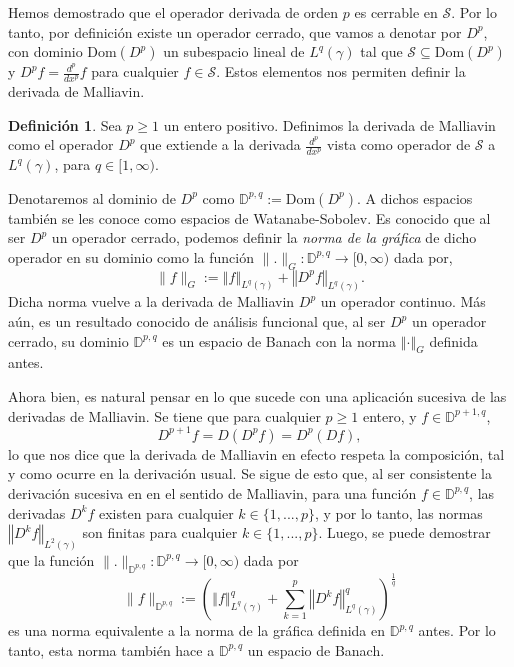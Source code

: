 \documentclass[letterpaper,twoside,12pt]{book}
\newcommand{\D}{\mathbb{D}}
\renewcommand{\S}{\mathcal{S}}
\newcommand{\1}{\mathds{1}}
\newcommand{\norm}[1]{\left\Vert #1 \right\Vert}
\theoremstyle{definition}
\newtheorem{dfn}{Definición}
\theoremstyle{definition}
\theoremstyle{remark}
\theoremstyle{definition}
\theoremstyle{definition}
\theoremstyle{definition}
\theoremstyle{definition}
\theoremstyle{definition}
\begin{document}
Hemos demostrado que el operador derivada de orden $p$ es cerrable en $\S$. Por lo tanto, por definición existe un operador cerrado, que vamos a denotar por $D^{p}$, con dominio $\text{Dom}(D^{p})$ un subespacio lineal de $L^{q}(\gamma)$ tal que $\S\subseteq \text{Dom}(D^{p})$ y $D^{p}f=\frac{d^{p}}{dx^{p}}f$ para cualquier $f\in \S$. Estos elementos nos permiten definir la derivada de Malliavin.

\begin{dfn}
   Sea $p\geq1$ un entero positivo. Definimos la derivada de Malliavin como el operador $D^{p}$ que extiende a la derivada $\frac{d^{p}}{dx^{p}}$ vista como operador de $\S$ a $L^{q}(\gamma)$, para $q\in [1,\infty)$.
\end{dfn}

Denotaremos al dominio de $D^{p}$ como $\D^{p,q}:=\text{Dom}(D^{p})$. A dichos espacios también se les conoce como espacios de Watanabe-Sobolev. Es conocido que al ser $D^{p}$ un operador cerrado, podemos definir la \textit{norma de la gráfica} de dicho operador en su dominio como la función $\|.\|_{G}:\D^{p,q}\longrightarrow[0,\infty)$ dada por,
\[
       \|f\|_{G}:=\norm{f}_{L^q(\gamma)}+\norm{D^{p}f}_{L^{q}(\gamma)}.
   \]
Dicha norma vuelve a la derivada de Malliavin $D^{p}$ un operador continuo. Más aún, es un resultado conocido de análisis funcional que, al ser $D^{p}$ un operador cerrado, su dominio $\D^{p,q}$ es un espacio de Banach con la norma $\norm{\cdot}_{G}$ definida antes.

Ahora bien, es natural pensar en lo que sucede con una aplicación sucesiva de las derivadas de Malliavin. Se tiene que para cualquier $p\geq1$ entero, y $f\in \D^{p+1,q}$, 
\[
   D^{p+1}f=D(D^{p}f)=D^{p}(Df),
\]
lo que nos dice que la derivada de Malliavin en efecto respeta la composición, tal y como ocurre en la derivación usual. Se sigue de esto que, al ser consistente la derivación sucesiva en en el sentido de Malliavin, para una función $f\in \D^{p,q}$, las derivadas $D^{k}f$ existen para cualquier $k\in \{1,...,p\}$, y por lo tanto, las normas $\norm{D^kf}_{L^2(\gamma)}$ son finitas para cualquier $k\in \{1,...,p\}$. Luego, se puede demostrar que la función $\|.\|_{\mathbb{D}^{p,q}}:\D^{p,q}\longrightarrow[0,\infty)$ dada por
\[
   \|f\|_{\D^{p,q}}:=\left(\norm{f}_{L^{q}(\gamma)}^q+\sum_{k=1}^p\norm{D^{k}f}_{L^{q}(\gamma)}^{q}\right)^{\frac{1}{q}}
\] 
es una norma equivalente a la norma de la gráfica definida en $\D^{p,q}$ antes. Por lo tanto, esta norma también hace a $\D^{p,q}$ un espacio de Banach.
\end{document}
